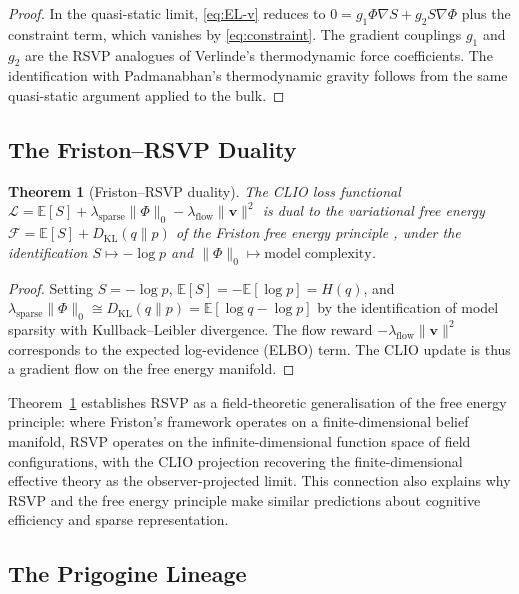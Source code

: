 \documentclass[12pt, a4paper]{article}
\theoremstyle{plain}
\newtheorem{theorem}{Theorem}[section]
\theoremstyle{definition}
\theoremstyle{remark}
\newcommand{\vfield}{\mathbf{v}}
\begin{document}
\begin{proof}
In the quasi-static limit, \eqref{eq:EL-v} reduces to $0 = g_1\Phi\nabla S + g_2 S\nabla\Phi$
plus the constraint term, which vanishes by \eqref{eq:constraint}.  The gradient couplings
$g_1$ and $g_2$ are the RSVP analogues of Verlinde's thermodynamic force coefficients.
The identification with Padmanabhan's thermodynamic gravity \cite{Padmanabhan2005} follows
from the same quasi-static argument applied to the bulk.
\end{proof}

\subsection{The Friston--RSVP Duality}

\begin{theorem}[Friston--RSVP duality]
\label{thm:friston}
The CLIO loss functional
$\mathcal{L} = \mathbb{E}[S] + \lambda_{\mathrm{sparse}}\|\Phi\|_0 - \lambda_{\mathrm{flow}}\|\vfield\|^2$
is dual to the variational free energy $\mathcal{F} = \mathbb{E}[S] + D_{\mathrm{KL}}(q\|p)$
of the Friston free energy principle \cite{Friston2021}, under the identification
$S \mapsto -\log p$ and $\|\Phi\|_0 \mapsto \mathrm{model\;complexity}$.
\end{theorem}

\begin{proof}
Setting $S = -\log p$, $\mathbb{E}[S] = -\mathbb{E}[\log p] = H(q)$, and
$\lambda_{\mathrm{sparse}}\|\Phi\|_0 \cong D_{\mathrm{KL}}(q\|p) = \mathbb{E}[\log q - \log p]$
by the identification of model sparsity with Kullback--Leibler divergence.  The flow
reward $-\lambda_{\mathrm{flow}}\|\vfield\|^2$ corresponds to the expected log-evidence
(ELBO) term.  The CLIO update is thus a gradient flow on the free energy manifold.
\end{proof}

Theorem~\ref{thm:friston} establishes RSVP as a field-theoretic generalisation of the
free energy principle: where Friston's framework operates on a finite-dimensional belief
manifold, RSVP operates on the infinite-dimensional function space of field configurations,
with the CLIO projection recovering the finite-dimensional effective theory as the
observer-projected limit.  This connection also explains why RSVP and the free energy
principle make similar predictions about cognitive efficiency and sparse representation.

\subsection{The Prigogine Lineage}
\end{document}

